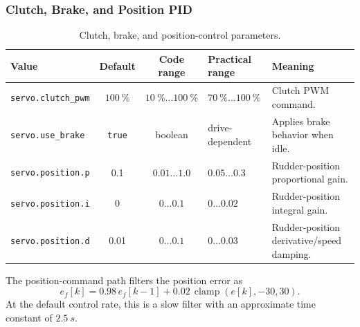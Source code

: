 \documentclass[11pt,twocolumn]{article}
\begin{document}
\subsubsection{Clutch, Brake, and Position PID}
\begin{table}[t]
\centering
\caption{Clutch, brake, and position-control parameters.}
\label{tab:pypilot-servo-position}
\begin{tabularx}{\textwidth}{Z{0.23\textwidth}c c Z{0.16\textwidth}Y}
\toprule
Value & Default & Code range & Practical range & Meaning \\
\midrule
\texttt{servo.clutch\_pwm} &
\(\SI{100}{\percent}\) &
\(\SI{10}{\percent}\ldots\SI{100}{\percent}\) &
\(\SI{70}{\percent}\ldots\SI{100}{\percent}\) &
Clutch PWM command. \\
\texttt{servo.use\_brake} &
\texttt{true} &
boolean &
drive-dependent &
Applies brake behavior when idle. \\
\texttt{servo.position.p} &
\num{0.1} &
\(\num{0.01}\ldots\num{1.0}\) &
\(\num{0.05}\ldots\num{0.3}\) &
Rudder-position proportional gain. \\
\texttt{servo.position.i} &
\num{0} &
\(\num{0}\ldots\num{0.1}\) &
\(\num{0}\ldots\num{0.02}\) &
Rudder-position integral gain. \\
\texttt{servo.position.d} &
\num{0.01} &
\(\num{0}\ldots\num{0.1}\) &
\(\num{0}\ldots\num{0.03}\) &
Rudder-position derivative/speed damping. \\
\bottomrule
\end{tabularx}
\end{table}
The position-command path filters the position error as
\[
e_f[k]
=
0.98\,e_f[k-1]
+
0.02\,\operatorname{clamp}(e[k],-30,30).
\]
At the default control rate, this is a slow filter with an approximate
time constant of \(\SI{2.5}{s}\).
\end{document}
